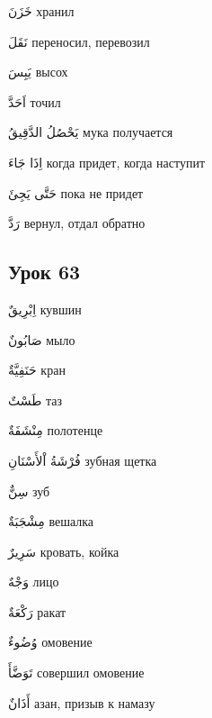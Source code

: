 \documentclass[a5paper]{article}
\newcommand\textstyleDropCaps[1]{#1}
\newcommand\textstyleCaptioncharacters[1]{#1}
\begin{document}
\textstyleCaptioncharacters{خَزَنَ }\textstyleDropCaps{хранил‎}

\textstyleCaptioncharacters{نَقَلَ }\textstyleDropCaps{переносил, перевозил‎}

\textstyleCaptioncharacters{يَبِسَ }\textstyleDropCaps{высох‎}

\textstyleCaptioncharacters{اَحَدَّ }\textstyleDropCaps{точил‎}

\textstyleCaptioncharacters{يَحْصُلُ الدَّقِيقُ }\textstyleDropCaps{мука по­лучается‎}

\textstyleCaptioncharacters{اِذَا جَاءَ }\textstyleDropCaps{когда придет, когда наступит‎}

\textstyleCaptioncharacters{حَتَّى يَجِئَ }\textstyleDropCaps{пока не при­дет ‎}

\textstyleCaptioncharacters{رَدَّ }\textstyleDropCaps{вернул, отдал обратно‎}

\subsection[Урок 63‎]{\textstyleDropCaps{Урок 63‎}}
\textstyleCaptioncharacters{اِبْرِيقٌ }\textstyleDropCaps{кувшин‎}

\textstyleCaptioncharacters{صَابُونٌ }\textstyleDropCaps{мыло‎}

\textstyleCaptioncharacters{حَنَفِيَّةٌ }\textstyleDropCaps{кран‎}

\textstyleCaptioncharacters{طَسْتٌ }\textstyleDropCaps{таз‎}

\textstyleCaptioncharacters{مِنْشَفَةٌ }\textstyleDropCaps{полотенце‎}

\textstyleCaptioncharacters{فُرْشَةُ اْلأَسْنَانِ }\textstyleDropCaps{зубная щетка‎}

\textstyleCaptioncharacters{سِنٌّ }\textstyleDropCaps{зуб‎}

\textstyleCaptioncharacters{مِشْجَبَةٌ }\textstyleDropCaps{вешалка‎}

\textstyleCaptioncharacters{سَرِيرٌ }\textstyleDropCaps{кровать, койка‎}

\textstyleCaptioncharacters{وَجْهٌ }\textstyleDropCaps{лицо‎}

\textstyleCaptioncharacters{رَكْعَةٌ }\textstyleDropCaps{ракат‎}

\textstyleCaptioncharacters{وُضُوءٌ }\textstyleDropCaps{омовение‎}

\textstyleCaptioncharacters{تَوَضَّأَ }\textstyleDropCaps{совершил омовение‎}

\textstyleCaptioncharacters{أَذَانٌ }\textstyleDropCaps{азан, призыв к нама­зу‎}
\end{document}
